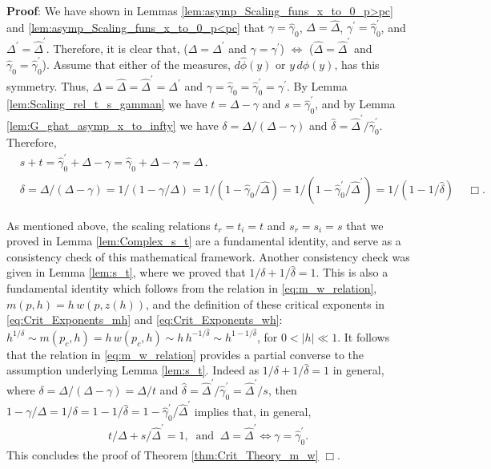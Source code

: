 \documentclass[english,12pt,jmp,graphicx]{revtex4-1}
\newcommand{\ph}{\hat{\phi}}
\newcommand{\gh}{\hat{\gamma}}
\newcommand{\Dh}{\hat{\Delta}}
\newcommand{\dha}{\hat{\delta}}
\begin{document}
%
\noindent \textbf{Proof}:
%
We have shown in Lemmas
\ref{lem:asymp_Scaling_funs_x_to_0_p>pc} and
\ref{lem:asymp_Scaling_funs_x_to_0_p<pc}  
that $\gamma=\gh_0$, $\Delta=\Dh$, $\gamma^\prime=\gh_0^\prime$, and $\Delta^\prime=\Dh^\prime$. Therefore, it
is clear that, ($\Delta=\Delta^\prime$ and $\gamma=\gamma^\prime$) $\iff$ ($\Dh=\Dh^\prime$ and
$\gh_0=\gh_0^\prime$). Assume that either of the measures, $d\ph(y)$
or $y\,d\phi(y)$, has this symmetry. Thus, $\Delta=\Dh=\Dh^\prime=\Delta^\prime$ and
$\gamma=\gh_0=\gh_0^\prime=\gamma^\prime$. By
Lemma \ref{lem:Scaling_rel_t_s_gamman} we have $t=\Delta-\gamma$ and
$s=\gh_0^\prime$, and by Lemma \ref{lem:G_ghat_asymp_x_to_infty} we have
$\delta=\Delta/(\Delta-\gamma)$ and $\dha=\Dh^\prime/\gh_0^\prime$. Therefore,    
%
\begin{align*}
  &s+t=\gh_0^\prime+\Delta-\gamma=\gh_0+\Delta-\gamma=\Delta\,.\\
  &\delta=\Delta/(\Delta-\gamma)=1/(1-\gamma/\Delta)=1/(1-\gh_0/\Dh)=1/(1-\gh_0^\prime/\Dh^\prime)=1/(1-1/\dha)\,
  \quad \Box.
\end{align*}

As mentioned above, the scaling relations $t_r=t_i=t$ and $s_r=s_i=s$
that we proved in Lemma \ref{lem:Complex_s_t} are a fundamental
identity, and serve as a consistency check of this mathematical
framework. Another consistency check was given in Lemma \ref{lem:s_t},
where we proved that $1/\delta+1/\dha=1$. This is also a fundamental
identity which follows from the relation in \eqref{eq:m_w_relation},
$m(p,h)=h\,w(p,z(h))$, and the definition of these critical exponents
in \eqref{eq:Crit_Exponents_mh} and \eqref{eq:Crit_Exponents_wh}:
$h^{1/\delta}\sim m(p_c,h)=h\,w(p_c,h)\sim h\,h^{-1/\dha}\sim h^{1-1/\dha}$, for
$0<|h|\ll1$. It follows that the relation in \eqref{eq:m_w_relation}
provides a partial converse to the assumption underlying Lemma 
\ref{lem:s_t}. Indeed as $1/\delta+1/\dha=1$ in general, where $\delta=\Delta/(\Delta-\gamma)=\Delta/t$
and $\dha=\Dh^\prime/\gh_0^\prime=\Dh^\prime/s$, then
$1-\gamma/\Delta=1/\delta=1-1/\dha=1-\gh_0^\prime/\Dh^\prime$ implies that, in general,
%
\begin{align}
  t/\Delta+s/\Dh^\prime=1, \ \text{ and } \   \Delta=\Dh^\prime\iff\gamma=\gh_0^\prime.
\end{align}
%
This concludes the proof of Theorem \ref{thm:Crit_Theory_m_w} $\Box$.
%
%
\end{document}
